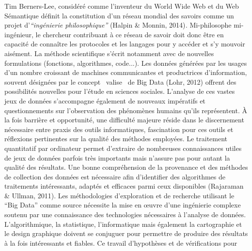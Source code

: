 Tim Berners-Lee, consid\'er\'e comme l{\textquoteright}inventeur du
World Wide Web et du Web S\'emantique d\'efinit la constitution
d{\textquoteright}un r\'eseau mondial des savoirs comme un projet
d{\textquoteright}\textit{{\textquotedblleft}ing\'enierie
philosophique{\textquotedblright} }(Halpin \& Monnin, 2014)\textit{.}
Mi-philosophe mi-ing\'enieur, le chercheur contribuant \`a ce r\'eseau
de savoir doit donc \^etre en capacit\'e de conna\^itre les protocoles
et les langages pour y acc\'eder et s{\textquoteright}y mouvoir
ais\'ement. La m\'ethode scientifique s{\textquoteright}\'ecrit
notamment avec de nouvelles formulations (fonctions, algorithmes,
code...). Les donn\'ees g\'en\'er\'ees par les usages
d{\textquoteright}un nombre croissant de machines communicantes et
productrices d{\textquoteright}information, souvent d\'esign\'ees par
le concept {\guillemotleft}~valise~{\guillemotright} de Big Data (Lohr,
2012) offrent des possibilit\'es nouvelles pour
l{\textquoteright}\'etude en sciences sociales.
L{\textquoteright}analyse de ces vastes jeux de donn\'ees
s{\textquoteright}accompagne \'egalement de nouveaux imp\'eratifs et
questionnements sur l{\textquoteright}observation des ph\'enom\`enes
humains qu{\textquoteright}ils repr\'esentent. \`A la fois barri\`ere
et opportunit\'e, une difficult\'e majeure r\'eside dans le
discernement n\'ecessaire entre praxis des outils informatiques,
fascination pour ces outils et r\'eflexions pertinentes sur la
qualit\'e des m\'ethodes employ\'ees. Le traitement quantitatif par
ordinateur permet d{\textquoteright}extraire de nombreuses
connaissances utiles de jeux de donn\'ees parfois tr\`es importants
mais n{\textquoteright}assure pas pour autant la qualit\'e des
r\'esultats. Une bonne compr\'ehension de la provenance et des
m\'ethodes de collection des donn\'ees est n\'ecessaire afin
d{\textquoteright}identifier des algorithmes de traitements
int\'eressants, adapt\'es et efficaces parmi ceux disponibles
(Rajaraman \& Ullman, 2011). Les m\'ethodologies
d{\textquoteright}exploration et de recherche utilisant le
{\textquotedblleft}Big Data{\textquotedblright} comme source
n\'ecessite la mise en {\oe}uvre d{\textquoteright}une ing\'enierie
complexe soutenu par une connaissance des technologies n\'ecessaires
\`a l{\textquoteright}analyse de donn\'ees.
L{\textquoteright}algorithmique, la statistique,
l{\textquoteright}informatique mais \'egalement la cartographie et le
design graphique doivent se conjuguer pour permettre de produire des
r\'esultats \`a la fois int\'eressants et fiables. Ce travail
d{\textquoteright}hypoth\`eses et de v\'erifications pour
